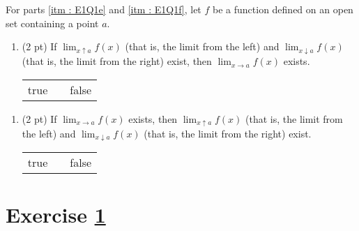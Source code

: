 For parts \ref{itm : E1Q1e} and \ref{itm : E1Q1f}, let $f$ be a function defined on an open set containing a point $a$.

\begin{enumerate}[resume,label=(\alph*)]
\item\label{itm : E1Q1e} (2 pt) If $\displaystyle\lim_{x \uparrow a} f(x)$ (that is, the limit from the left) and $\displaystyle\lim_{x \downarrow a} f(x)$ (that is, the limit from the right) exist, then $\displaystyle\lim_{x \rightarrow a} f(x)$ exists.
\begin{center}
\begin{tabular}{c c c}
true	&	\hspace{1in}	&	false
\end{tabular}
\end{center}
\end{enumerate}


\begin{enumerate}[resume,label=(\alph*)]
\item\label{itm : E1Q1f} (2 pt) If $\displaystyle\lim_{x \rightarrow a} f(x)$ exists, then $\displaystyle\lim_{x \uparrow a} f(x)$ (that is, the limit from the left) and $\displaystyle\lim_{x \downarrow a} f(x)$ (that is, the limit from the right) exist.
\begin{center}
\begin{tabular}{c c c}
true	&	\hspace{1in}	&	false
\end{tabular}
\end{center}
\end{enumerate}






%
%
%
%


\newpage

\section{Exercise \ref{sec : Math112 Spring2022 Exam1 Q2}}
\label{sec : Math112 Spring2022 Exam1 Q2}

